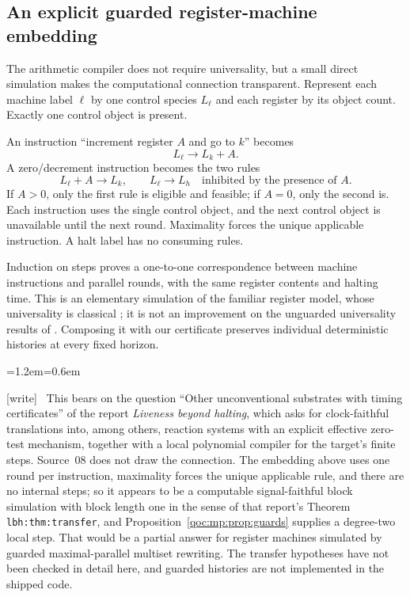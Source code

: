 \documentclass[11pt,letterpaper]{article}
\theoremstyle{definition}
\theoremstyle{remark}
\newcommand{\wtag}{\textup{[write]}}
\newenvironment{writenote}{\par\smallskip\begin{list}{}{\leftmargin=1.2em\rightmargin=0.6em}\item[]\small\wtag\ }{\end{list}\smallskip}
\newcommand{\lab}[1]{\nolinkurl{#1}}
\begin{document}
\subsection{An explicit guarded register-machine embedding}
The arithmetic compiler does not require universality, but a small direct
simulation makes the computational connection transparent. Represent each
machine label $\ell$ by one control species $L_\ell$ and each register by
its object count. Exactly one control object is present.

An instruction ``increment register $A$ and go to $k$'' becomes
\[
 L_\ell\longrightarrow L_k+A.
\]
A zero/decrement instruction becomes the two rules
\[
 L_\ell+A\longrightarrow L_k,
 \qquad
 L_\ell\longrightarrow L_h\quad\text{inhibited by the presence of }A.
\]
If $A>0$, only the first rule is eligible and feasible; if $A=0$, only the
second is. Each instruction uses the single control object, and the next
control object is unavailable until the next round. Maximality forces the
unique applicable instruction. A halt label has no consuming rules.

Induction on steps proves a one-to-one correspondence between machine
instructions and parallel rounds, with the same register contents and
halting time. This is an elementary simulation of the familiar register
model, whose universality is classical \cite{mp:minsky}; it is not an
improvement on the unguarded universality results of \cite{mp:alhazov}.
Composing it with our certificate preserves individual deterministic
histories at every fixed horizon.

\begin{writenote}
This bears on the question ``Other unconventional substrates with timing certificates'' of the report \emph{Liveness beyond halting}, which asks for clock-faithful translations into, among others, reaction systems with an explicit effective zero-test mechanism, together with a local polynomial compiler for the target's finite steps. Source~08 does not draw the connection. The embedding above uses one round per instruction, maximality forces the unique applicable rule, and there are no internal steps; so it appears to be a computable signal-faithful block simulation with block length one in the sense of that report's Theorem \lab{lbh:thm:transfer}, and Proposition~\ref{qoc:mp:prop:guards} supplies a degree-two local step. That would be a partial answer for register machines simulated by guarded maximal-parallel multiset rewriting. The transfer hypotheses have not been checked in detail here, and guarded histories are not implemented in the shipped code.
\end{writenote}
\end{document}
